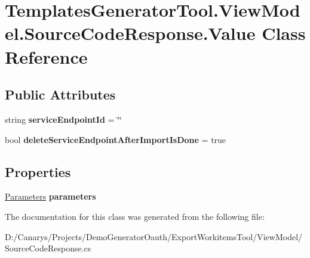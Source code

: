 \hypertarget{class_templates_generator_tool_1_1_view_model_1_1_source_code_response_1_1_value}{}\section{Templates\+Generator\+Tool.\+View\+Model.\+Source\+Code\+Response.\+Value Class Reference}
\label{class_templates_generator_tool_1_1_view_model_1_1_source_code_response_1_1_value}
\subsection*{Public Attributes}
\begin{DoxyCompactItemize}
\item 
\mbox{\label{class_templates_generator_tool_1_1_view_model_1_1_source_code_response_1_1_value_affff163626c11597354d48e523397c98}} 
string {\bfseries service\+Endpoint\+Id} = \char`\"{}\char`\"{}
\item 
\mbox{\label{class_templates_generator_tool_1_1_view_model_1_1_source_code_response_1_1_value_a1fa8bd4e81fad1256ce731575f153e6d}} 
bool {\bfseries delete\+Service\+Endpoint\+After\+Import\+Is\+Done} = true
\end{DoxyCompactItemize}
\subsection*{Properties}
\begin{DoxyCompactItemize}
\item 
\mbox{\label{class_templates_generator_tool_1_1_view_model_1_1_source_code_response_1_1_value_adeada7b965588f933b95e236ff5c3c35}} 
\mbox{\hyperlink{class_templates_generator_tool_1_1_view_model_1_1_source_code_response_1_1_parameters}{Parameters}} {\bfseries parameters}
\end{DoxyCompactItemize}


The documentation for this class was generated from the following file\+:\begin{DoxyCompactItemize}
\item 
D\+:/\+Canarys/\+Projects/\+Demo\+Generator\+Oauth/\+Export\+Workitems\+Tool/\+View\+Model/Source\+Code\+Response.\+cs\end{DoxyCompactItemize}
